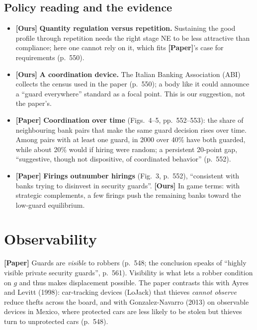 \documentclass[11pt,a4paper]{article}
\newcommand{\paper}{\textbf{[Paper]}}
\newcommand{\ours}{\textbf{[Ours]}}
\begin{document}
\subsection{Policy reading and the evidence}
\begin{itemize}
  \item \ours{} \textbf{Quantity regulation versus repetition.} Sustaining the good profile through repetition needs the right stage NE to be less attractive than compliance; here one cannot rely on it, which fits \paper{}'s case for requirements (p.\ 550).
  \item \ours{} \textbf{A coordination device.} The Italian Banking Association (ABI) collects the census used in the paper (p.\ 550); a body like it could announce a ``guard everywhere'' standard
        as a focal point. This is our suggestion, not the paper's.
  \item \paper{} \textbf{Coordination over time} (Figs.\ 4--5, pp.\ 552--553): the share of neighbouring bank pairs that make the same guard decision rises over time. Among pairs with at least one guard, in 2000
        over 40\% have both guarded, while about 20\% would if hiring were random; a persistent 20-point gap, ``suggestive, though not dispositive, of coordinated behavior'' (p.\ 552).
  \item \paper{} \textbf{Firings outnumber hirings} (Fig.\ 3, p.\ 552), ``consistent with banks trying to disinvest in security guards''. \ours{} In game terms: with strategic complements, a few firings
        push the remaining banks toward the low-guard equilibrium.
\end{itemize}

\section{Observability}

\paper{} Guards are \emph{visible} to robbers (p.\ 548; the conclusion speaks of ``highly visible private security guards'', p.\ 561). Visibility is what lets a robber condition on $g$ and thus makes displacement possible.
The paper contrasts this with Ayres and Levitt (1998): car-tracking devices (LoJack) that thieves \emph{cannot observe} reduce thefts across the board, and with Gonzalez-Navarro (2013) on observable devices in Mexico, where protected cars
are less likely to be stolen but thieves turn to unprotected cars (p.\ 548).
\end{document}
